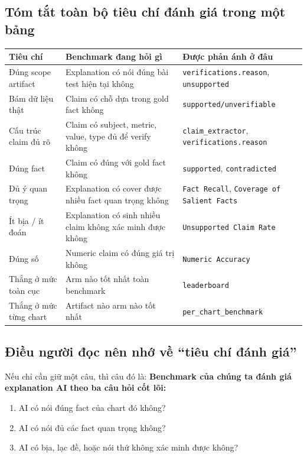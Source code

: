 \documentclass[11pt,a4paper]{article}
\newcommand{\field}[1]{\texttt{#1}}
\begin{document}
\subsection{Tóm tắt toàn bộ tiêu chí đánh giá trong một bảng}
\begin{table}[h]
\centering
\small
\begin{tabular}{>{\raggedright\arraybackslash}p{3.7cm} >{\raggedright\arraybackslash}p{5.1cm} >{\raggedright\arraybackslash}p{4.2cm}}
\toprule
Tiêu chí & Benchmark đang hỏi gì & Được phản ánh ở đâu \\
\midrule
Đúng scope artifact & Explanation có nói đúng bài test hiện tại không & \field{verifications.reason}, \field{unsupported} \\
Bám dữ liệu thật & Claim có chỗ dựa trong gold fact không & \field{supported/unverifiable} \\
Cấu trúc claim đủ rõ & Claim có subject, metric, value, type đủ để verify không & \field{claim\_extractor}, \field{verifications.reason} \\
Đúng fact & Claim có đúng với gold fact không & \field{supported}, \field{contradicted} \\
Đủ ý quan trọng & Explanation có cover được nhiều fact quan trọng không & \field{Fact Recall}, \field{Coverage of Salient Facts} \\
Ít bịa / ít đoán & Explanation có sinh nhiều claim không xác minh được không & \field{Unsupported Claim Rate} \\
Đúng số & Numeric claim có đúng giá trị không & \field{Numeric Accuracy} \\
Thắng ở mức toàn cục & Arm nào tốt nhất toàn benchmark & \field{leaderboard} \\
Thắng ở mức từng chart & Artifact nào arm nào tốt nhất & \field{per\_chart\_benchmark} \\
\bottomrule
\end{tabular}
\end{table}

\subsection{Điều người đọc nên nhớ về ``tiêu chí đánh giá''}
Nếu chỉ cần giữ một câu, thì câu đó là:
\textbf{Benchmark của chúng ta đánh giá explanation AI theo ba câu hỏi cốt lõi:}
\begin{enumerate}
  \item AI có nói đúng fact của chart đó không?
  \item AI có nói đủ các fact quan trọng không?
  \item AI có bịa, lạc đề, hoặc nói thứ không xác minh được không?
\end{enumerate}
\end{document}
